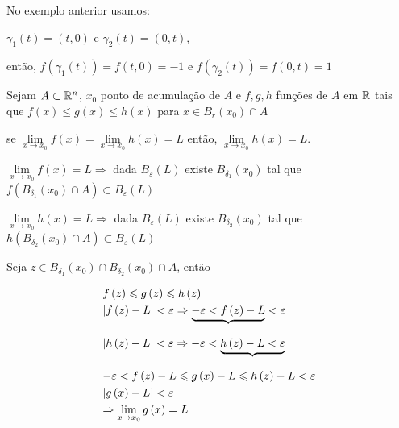 \documentclass{book}
\begin{document}
\begin{ex}
No exemplo anterior usamos:
\end{ex}

\begin{sol}
    $\gamma _1 \left( t \right) = \left( {t,0} \right)$ e $\gamma _2 \left( t \right) = \left( {0,t} \right)$,

     ent\~ao, $f\left( {\gamma _1 \left( t \right)} \right) = f\left( {t,0} \right) =  - 1$ e $f\left( {\gamma _2 \left( t \right)} \right) = f\left( {0,t} \right) = 1$
\end{sol}

\begin{teo}[do confronto]
    Sejam $A \subset \mathbb{R}^n$, $x_0$ ponto de acumula\c c\~ao de $A$ e $f,g,h$ fun\c c\~oes de $A$ em $\mathbb{R}$ tais que $f\left( x \right) \leqslant g\left( x \right) \leqslant h\left( x \right)$ para $x \in B_r \left( {x_0 } \right) \cap A$

    se $\mathop {\lim }\limits_{x \to x_0 } f\left( x \right) = \mathop {\lim }\limits_{x \to x_0 } h\left( x \right) = L$ ent\~ao, $\mathop {\lim }\limits_{x \to x_0 } h\left( x \right) = L$.
\end{teo}

\begin{dem}
    $\mathop {\lim }\limits_{x \to x_0 } f\left( x \right) = L \Rightarrow$ dada $B_\varepsilon  \left( L \right)$ existe $B_{\delta _1 } \left( {x_0 } \right)$ tal que $f\left( {B_{\delta _1 } \left( {x_0 } \right) \cap A} \right) \subset B_\varepsilon  \left( L \right)$

    $\mathop {\lim }\limits_{x \to x_0 } h\left( x \right) = L \Rightarrow$ dada $B_\varepsilon  \left( L \right)$ existe $B_{\delta _2 } \left( {x_0 } \right)$ tal que $h\left( {B_{\delta _2 } \left( {x_0 } \right) \cap A} \right) \subset B_\varepsilon  \left( L \right)$

    Seja $z \in B_{\delta _1 } \left( {x_0 } \right) \cap B_{\delta _2 } \left( {x_0 } \right) \cap A$, ent\~ao

\[
\begin{gathered}
      f\left( z \right) \leqslant g\left( z \right) \leqslant h\left( z \right) \hfill \\
      \left| {f\left( z \right) - L} \right| < \varepsilon  \Rightarrow \underbrace { - \varepsilon  < f\left( z \right) - L}_{} < \varepsilon  \hfill \\
      \left| {h\left( z \right) - L} \right| < \varepsilon  \Rightarrow  - \varepsilon  < \underbrace {h\left( z \right) - L < \varepsilon }_{} \hfill \\
       - \varepsilon  < f\left( z \right) - L \leqslant g\left( x \right) - L \leqslant h\left( z \right) - L < \varepsilon  \hfill \\
\left| {g\left( x \right) - L} \right| < \varepsilon  \hfill \\
       \Rightarrow \mathop {\lim }\limits_{x \to x_0 } g\left( x \right) = L \hfill \\
\end{gathered}
\]

\end{dem}
\end{document}
